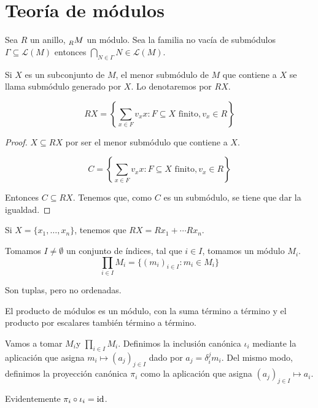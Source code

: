 \section{Teoría de módulos}

Sea \(R\) un anillo, \(\prescript{}{R}{M}\) un módulo. Sea la
familia no vacía de submódulos
\(\Gamma\subseteq\mathcal{L}(M)\) entonces
\(\bigcap_{N\in\Gamma} N\in\mathcal{L}(M)\).

\begin{df}
  Si \(X\) es un subconjunto de \(M\), el menor submódulo de \(M\) que contiene
  a \(X\) se llama submódulo generado por \(X\). Lo denotaremos por \(RX\).
\end{df}

\begin{lema}
  \[
    RX=\left\{\sum_{x\in F}v_x x:F\subseteq X \textrm{ finito}, v_x\in
    R\right\}
  \]
\end{lema}
\begin{proof}
  \(X\subseteq RX\) por ser el menor submódulo que contiene a \(X\).

  \[
    C=\left\{\sum_{x\in F}v_x x:F\subseteq X \textrm{ finito}, v_x\in
    R\right\}
  \]

  Entonces \(C\subseteq RX\).
  Tenemos que, como \(C\) es un submódulo, se tiene que dar la igualdad.

\end{proof}

Si \(X=\{x_1,\ldots, x_n\}\), tenemos que \(RX=Rx_1+\cdots Rx_n\).

\begin{df}
  Tomamos \(I\neq\emptyset\) un conjunto de índices, tal que
  \(i\in I\), tomamos un módulo \(M_i\).
  \[
    \prod_{i\in I} M_i=\{{(m_i)}_{i\in I}:m_i\in M_i\}
  \]

  Son tuplas, pero no ordenadas.
\end{df}

\begin{prop}
  El producto de módulos es un módulo, con la suma término a término y el
  producto por escalares también término a término.
\end{prop}

\begin{df}
  Vamos a tomar \(M_i\)y \( \prod_{i\in I} M_i\). Definimos
  la inclusión canónica \(\iota_i\)  mediante la
  aplicación que asigna \(m_i\mapsto {(a_j)}_{j\in I}\) dado por
  \(a_j=\delta_i^j m_i\).
  Del mismo modo, definimos la proyección canónica \(\pi_i\) como
  la aplicación que asigna \({(a_j)}_{j\in I}\mapsto a_i\).

  Evidentemente \(\pi_i\circ\iota_i=\operatorname{id}\).
\end{df}


